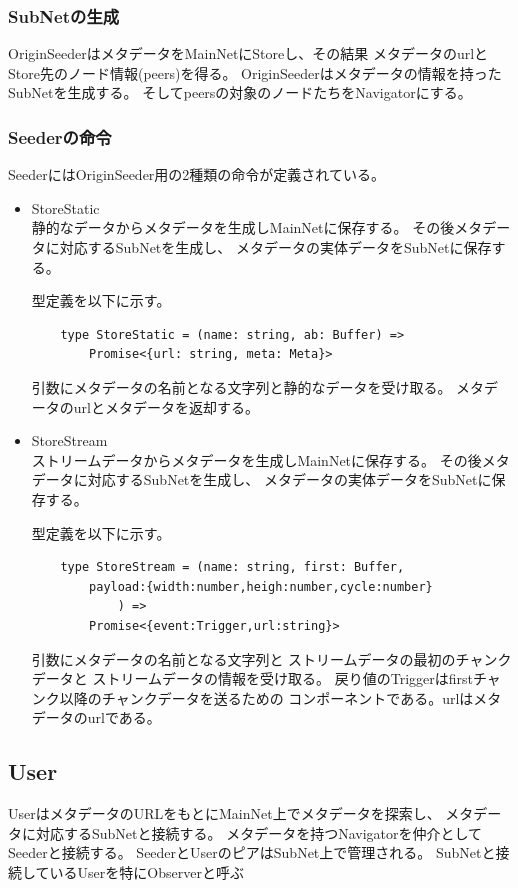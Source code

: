 \documentclass[sotsuron]{jcsie}
\begin{document}
\subsubsection{SubNetの生成}
OriginSeederはメタデータをMainNetにStoreし、その結果
メタデータのurlとStore先のノード情報(peers)を得る。
OriginSeederはメタデータの情報を持ったSubNetを生成する。
そしてpeersの対象のノードたちをNavigatorにする。

\subsubsection{Seederの命令}
SeederにはOriginSeeder用の2種類の命令が定義されている。
\begin{itemize}
	\item{StoreStatic} \\
	静的なデータからメタデータを生成しMainNetに保存する。
	その後メタデータに対応するSubNetを生成し、
	メタデータの実体データをSubNetに保存する。
			
	型定義を以下に示す。
	\begin{lstlisting}
	type StoreStatic = (name: string, ab: Buffer) =>
		Promise<{url: string, meta: Meta}>
	\end{lstlisting}
			
	引数にメタデータの名前となる文字列と静的なデータを受け取る。
	メタデータのurlとメタデータを返却する。
		
	\item {StoreStream}\\
	      ストリームデータからメタデータを生成しMainNetに保存する。
	      その後メタデータに対応するSubNetを生成し、
	      メタデータの実体データをSubNetに保存する。
	      	      
	      型定義を以下に示す。
	      \begin{lstlisting}
	type StoreStream = (name: string, first: Buffer,
		payload:{width:number,heigh:number,cycle:number}
			) =>
		Promise<{event:Trigger,url:string}>
	      \end{lstlisting}
	      	      
	      引数にメタデータの名前となる文字列と
	      ストリームデータの最初のチャンクデータと
	      ストリームデータの情報を受け取る。
	      戻り値のTriggerはfirstチャンク以降のチャンクデータを送るための
	      コンポーネントである。urlはメタデータのurlである。
\end{itemize}

\subsection{User}
UserはメタデータのURLをもとにMainNet上でメタデータを探索し、
メタデータに対応するSubNetと接続する。
メタデータを持つNavigatorを仲介としてSeederと接続する。
SeederとUserのピアはSubNet上で管理される。
SubNetと接続しているUserを特にObserverと呼ぶ
\end{document}
